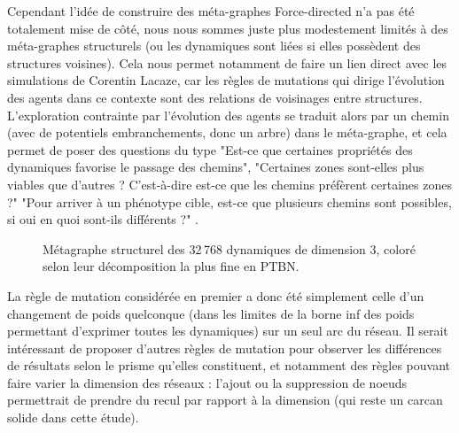 \documentclass[12pt, a4paper]{article}
\begin{document}
Cependant l'idée de construire des méta-graphes Force-directed n'a pas été totalement mise de côté, nous nous sommes juste plus modestement limités à des méta-graphes structurels (ou les dynamiques sont liées si elles possèdent des structures voisines). Cela nous permet notamment de faire un lien direct avec les simulations de Corentin Lacaze, car les règles de mutations qui dirige l'évolution des agents dans ce contexte sont des relations de voisinages entre structures. L'exploration contrainte par l'évolution des agents se traduit alors par un chemin (avec de potentiels embranchements, donc un arbre) dans le méta-graphe, et cela permet de poser des questions du type "Est-ce que certaines propriétés des dynamiques favorise le passage des chemins", "Certaines zones sont-elles plus viables que d'autres ? C'est-à-dire est-ce que les chemins préfèrent certaines zones ?" "Pour arriver à un phénotype cible, est-ce que plusieurs chemins sont possibles, si oui en quoi sont-ils différents ?" .

\begin{figure}[H]
    \centering
    \caption{Métagraphe structurel des 32\,768 dynamiques de dimension 3, coloré selon leur décomposition la plus fine en PTBN.}
    \label{fig:metagraphe-3d}
\end{figure}

La règle de mutation considérée en premier a donc été simplement celle d'un changement de poids quelconque (dans les limites de la borne inf des poids permettant d'exprimer toutes les dynamiques) sur un seul arc du réseau. Il serait intéressant de proposer d'autres règles de mutation pour observer les différences de résultats selon le prisme qu'elles constituent, et notamment des règles pouvant faire varier la dimension des réseaux : l'ajout ou la suppression de noeuds permettrait de prendre du recul par rapport à la dimension (qui reste un carcan solide dans cette étude). 
\end{document}
